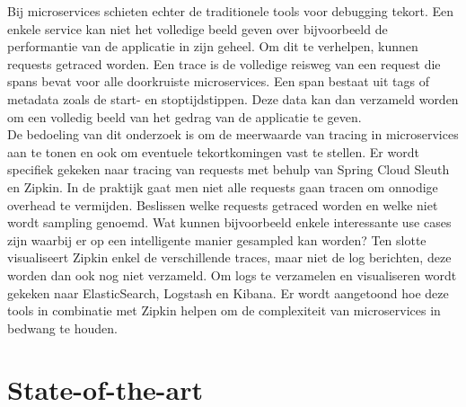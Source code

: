 \documentclass[fleqn,10pt]{voorstel}
\begin{document}
Bij microservices schieten echter de traditionele tools voor debugging tekort. Een enkele service kan niet het volledige beeld geven over bijvoorbeeld de performantie van de applicatie in zijn geheel. Om dit te verhelpen, kunnen requests getraced worden. Een trace is de volledige reisweg van een request die spans bevat voor alle doorkruiste microservices. Een span bestaat uit tags of metadata zoals de start- en stoptijdstippen. Deze data kan dan verzameld worden om een volledig beeld van het gedrag van de applicatie te geven. \\

De bedoeling van dit onderzoek is om de meerwaarde van tracing in microservices aan te tonen en ook om eventuele tekortkomingen vast te stellen. Er wordt specifiek gekeken naar tracing van requests met behulp van Spring Cloud Sleuth en Zipkin. In de praktijk gaat men niet alle requests gaan tracen om onnodige overhead te vermijden. Beslissen welke requests getraced worden en welke niet wordt sampling genoemd. Wat kunnen bijvoorbeeld enkele interessante use cases zijn waarbij er op een intelligente manier gesampled kan worden? Ten slotte visualiseert Zipkin enkel de verschillende traces, maar niet de log berichten, deze worden dan ook nog niet verzameld. Om logs te verzamelen en visualiseren wordt gekeken naar ElasticSearch, Logstash en Kibana. Er wordt aangetoond hoe deze tools in combinatie met Zipkin helpen om de complexiteit van microservices in bedwang te houden.  \\


\section{State-of-the-art}
\label{sec:state-of-the-art}

\end{document}
